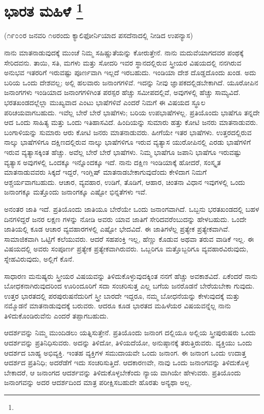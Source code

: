 
\chapter[ಭಾರತ ಮಹಿಳೆ ]{ಭಾರತ ಮಹಿಳೆ \protect\footnote{}}

\centerline{(೧೯೦೦ರ ಜನವರಿ ೧೮ರಂದು ಕ್ಯಾಲಿಫೋರ್ನಿಯಾದ ಪಸದೆನಾದಲ್ಲಿ ನೀಡಿದ ಉಪನ್ಯಾಸ)}

ನಾನು ಮಾತನಾಡುವುದಕ್ಕೆ ಮುಂಚೆ ನಿಮ್ಮ ಸಹಿಷ್ಣುತೆಯನ್ನು ಕೋರುತ್ತೇನೆ. ನಾನು ಮದುವೆಯಾಗದವರ ಪಂಥಕ್ಕೆ ಸೇರಿದವನು. ತಾಯಿ, ಸತಿ, ಮಗಳು ಮತ್ತು ಸೋದರಿ ಇವರ ಸ್ಥಾನದಲ್ಲಿರುವ ಸ್ತ್ರೀಯರ ವಿಷಯದಲ್ಲಿ ನನಗಿರುವ ಅನುಭವ ಇತರರಿಗೆ ಇರುವಷ್ಟು ಪೂರ್ಣವಾಗಿ ಇಲ್ಲದೆ ಇರಬಹುದು. ಇಂಡಿಯಾ ದೇಶ ದೊಡ್ಡದೊಂದು ಖಂಡ. ಅದು ಬರಿಯ ಒಂದು ದೇಶವಲ್ಲ; ಅಲ್ಲಿ ಹಲವಾರು ಜನಾಂಗಗಳಿವೆ. ಇದನ್ನು ನೀವು ಜ್ಞಾಪಕದಲ್ಲಿಡಬೇಕಾಗಿದೆ. ಯೂರೋಪಿನ ಜನಾಂಗಗಳು ಇಂಡಿಯಾದ ಜನಾಂಗಗಳಿಗಿಂತ ಪರಸ್ಪರ ಹೆಚ್ಚು ಸಮೀಪದಲ್ಲಿವೆ, ಅವುಗಳಲ್ಲಿ ಹೆಚ್ಚು ಸಾಮ್ಯವಿದೆ. ಭರತಖಂಡದಲ್ಲೆಲ್ಲಾ ಮುಖ್ಯವಾದ ಎಂಟು ಭಾಷೆಗಳಿವೆ ಎಂದರೆ ನಿಮಗೆ ಈ ವಿಷಯದ ಸ್ಥೂಲ ಪರಿಚಯವಾಗಬಹುದು. ಇವೆಲ್ಲ ಬೇರೆ ಬೇರೆ ಭಾಷೆಗಳು; ಬರಿಯ ಉಪಭಾಷೆಗಳಲ್ಲ. ಪ್ರತಿಯೊಂದು ಭಾಷೆಗೂ ತನ್ನದೇ ಆದ ಒಂದು ಸಾಹಿತ್ಯ ಮತ್ತು ಒಂದು ಇತಿಹಾಸವಿದೆ. ಹಿಂದಿಯನ್ನು ಸುಮಾರು ಹತ್ತು ಕೋಟಿ ಜನರು ಮಾತನಾಡುವರು. ಬಂಗಾಳಿಯನ್ನು ಸುಮಾರು ಆರು ಕೋಟಿ ಜನರು ಮಾತನಾಡುವರು. ಹೀಗೆಯೇ ಇತರ ಭಾಷೆಗಳು. ಉತ್ತರದಲ್ಲಿರುವ ನಾಲ್ಕು ಭಾಷೆಗಳಿಗೂ ದಕ್ಷಿಣದಲ್ಲಿರುವ ನಾಲ್ಕು ಭಾಷೆಗಳಿಗೂ ಇರುವ ವ್ಯತ್ಯಾಸ ಯುರೋಪಿನಲ್ಲಿ ಎರಡು ಭಾಷೆಗಳಿಗೆ ಇರುವ ವ್ಯತ್ಯಾಸಕ್ಕಿಂತ ಹೆಚ್ಚು. ಅವೆಲ್ಲ ಬೇರೆ ಬೇರೆ ಭಾಷೆಗಳು. ನಿಮ್ಮ ಭಾಷೆಗೂ ಜಪಾನಿ ಭಾಷೆಗೂ ಇರುವಷ್ಟು ವ್ಯತ್ಯಾಸ ಅವುಗಳಲ್ಲಿ ಒಂದಕ್ಕೂ ಇನ್ನೊಂದಕ್ಕೂ ಇದೆ. ನಾನು ದಕ್ಷಿಣ ಇಂಡಿಯಾಕ್ಕೆ ಹೋದರೆ, ಸಂಸ್ಕೃತ ಮಾತನಾಡುವವರು ಸಿಕ್ಕದೆ ಇದ್ದರೆ, ಇಂಗ್ಲಿಷ್​ ಮಾತನಾಡಬೇಕಾಗುವುದೆಂದು ಕೇಳಿದಾಗ ನಿಮಗೆ ಆಶ್ಚರ್ಯವಾಗಬಹುದು. ಆಚಾರ, ವ್ಯವಹಾರ, ಉಡಿಗೆ, ತೊಡಿಗೆ, ಆಹಾರ, ಚಿಂತನಾ ವಿಧಾನ ಇವುಗಳಲ್ಲಿ ಒಂದು ಜನಾಂಗಕ್ಕೂ ಮತ್ತೊಂದು ಜನಾಂಗಕ್ಕೂ ಎಷ್ಟೋ ಭಿನ್ನತೆಗಳು ಇವೆ.

ಅನಂತರ ಜಾತಿ ಇದೆ. ಪ್ರತಿಯೊಂದು ಜಾತಿಯೂ ಬೇರೆಯೇ ಒಂದು ಜನಾಂಗವಾಗಿದೆ. ಒಬ್ಬನು ಭರತಖಂಡದಲ್ಲಿ ಬಹಳ ದಿನಗಳಿದ್ದರೆ ಜನರ ಲಕ್ಷಣ ಗಳನ್ನು ನೋಡಿ ಅವರು ಯಾವ ಜಾತಿಗೆ ಸೇರಿದವರೆಂಬುದನ್ನು ಹೇಳಬಹುದು. ಒಂದೇ ಜಾತಿಯಲ್ಲಿ ಕೂಡ ಆಚಾರ ವ್ಯವಹಾರಗಳಲ್ಲಿ ಎಷ್ಟೋ ಭೇದವಿದೆ. ಈ ಜಾತಿಗಳೆಲ್ಲ ಪ್ರತ್ಯೇಕ ಪ್ರತ್ಯೇಕವಾಗಿವೆ. ಸಾಮಾಜಿಕವಾಗಿ ಒಟ್ಟಿಗೆ ಕಲೆಯುವರು. ಆದರೆ ಸಹಪಂಕ್ತಿ ಇಲ್ಲ, ಹೆಣ್ಣು ಕೊಡುವ ಅಥವಾ ತರುವ ವಾಡಿಕೆ ಇಲ್ಲ. ಈ ವಿಷಯದಲ್ಲಿ ಅವರು ಸಂಪೂರ್ಣ ಪ್ರತ್ಯೇಕ ಪ್ರತ್ಯೇಕವಾಗಿರುವರು. ಒಬ್ಬರಿಗೂ ಮತ್ತೊಬ್ಬರಿಗೂ ವ್ಯವಹಾರವಿರುವುದು, ಸ್ನೇಹವಿರುವುದು, ಅಲ್ಲಿಗೆ ಕೊನೆ.

ಸಾಧಾರಣ ಮನುಷ್ಯರು ಸ್ತ್ರೀಯರ ವಿಷಯವನ್ನು ತಿಳಿದುಕೊಳ್ಳುವುದಕ್ಕಿಂತ ನನಗೆ ಹೆಚ್ಚು ಅವಕಾಶವಿದೆ. ಏಕೆಂದರೆ ನಾನು ಬೋಧಕನಾಗಿರುವುದರಿಂದ ಊರಿಂದೂರಿಗೆ ಸದಾ ಸಂಚರಿಸುತ್ತ ಎಲ್ಲ ಬಗೆಯ ಜನರೊಡನೆ ಬೇರೆಯಬೇಕಾ ಗುವುದು. ಉತ್ತರ ಭಾರತದಲ್ಲಿ ಪರಪುರುಷನೆದುರಿಗೆ ಸ್ತ್ರೀ ಬಾರದೇ ಇದ್ದರೂ, ನಮ್ಮ ಬೋಧನೆಯನ್ನು ಕೇಳುವುದಕ್ಕೆ ಮತ್ತು ನಮ್ಮೊಡನೆ ಮಾತನಾಡುವುದಕ್ಕೆ ಬರುವರು. ಆದರೂ ಕೂಡ ಭಾರತದ ಮಹಿಳೆಯರ ವಿಷಯವನ್ನೆಲ್ಲ ನಾನು ತಿಳಿದುಕೊಂಡಿರುವೆನು ಎಂದರೆ ತಪ್ಪಾಗಬಹುದು.

ಆದರ್ಶವನ್ನು ನಿಮ್ಮ ಮುಂದಿಡಲು ಯತ್ನಿಸುತ್ತೇನೆ. ಪ್ರತಿಯೊಂದು ಜನಾಂಗ ದಲ್ಲಿಯೂ ಅಲ್ಲಿಯ ಸ್ತ್ರೀಪುರುಷರು ಒಂದು ಆದರ್ಶವನ್ನು ಪ್ರತಿನಿಧಿಸುವರು. ಅದನ್ನು ತಿಳಿದೋ, ತಿಳಿಯದೆಯೋ, ಅನುಷ್ಠಾನಕ್ಕೆ ತರುತ್ತಿರುವರು. ವ್ಯಕ್ತಿಯು ಒಂದು ಆದರ್ಶದ ಬಾಹ್ಯ ಅಭಿವ್ಯಕ್ತಿ. ಇಂತಹ ವ್ಯಕ್ತಿಗಳ ಸಮುದಾಯವೇ ಒಂದು ಜನಾಂಗ. ಈ ಜನಾಂಗ ಒಂದು ಉದಾತ್ತ ಆದರ್ಶದ ಪ್ರತಿನಿಧಿ; ಅದರೆಡೆಗೆ ಇದು ಸಂಚರಿಸುತ್ತಿದೆ. ಆದಕಾರಣವೇ, ನಾವು ಒಂದು ಜನಾಂಗವನ್ನು ತಿಳಿದುಕೊಳ್ಳ ಬೇಕಾದರೆ, ಆ ಜನಾಂಗದ ಆದರ್ಶವನ್ನು ತಿಳಿದುಕೊಳ್ಳಬೇಕೆಂದು ನ್ಯಾಯ ವಾಗಿಯೇ ಹೇಳುವರು. ಪ್ರತಿಯೊಂದು ಜನಾಂಗವನ್ನು ಅದರ ಆದರ್ಶದಿಂದ ಮಾತ್ರ ಪರೀಕ್ಷಿಸಬಹುದೇ ಹೊರತು ಅನ್ಯಥಾ ಅಲ್ಲ.

